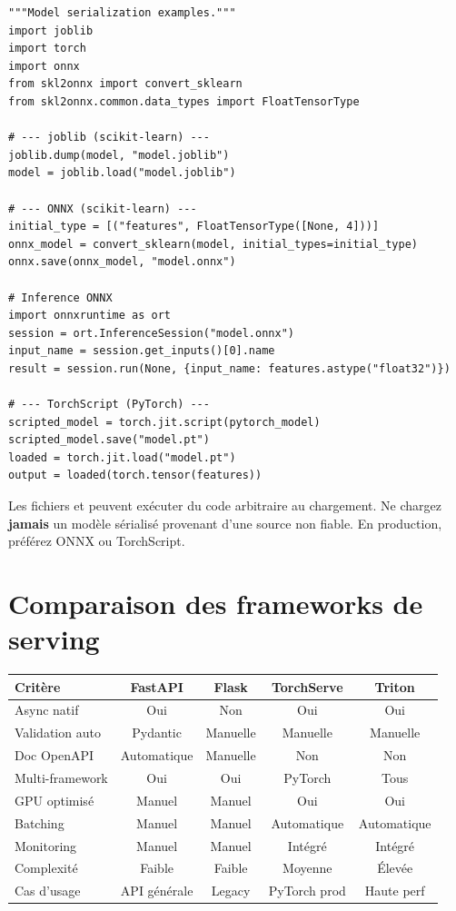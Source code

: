 \begin{codeblock}[title=\textbf{Export de mod\`eles dans diff\'erents formats}]
\begin{verbatim}
"""Model serialization examples."""
import joblib
import torch
import onnx
from skl2onnx import convert_sklearn
from skl2onnx.common.data_types import FloatTensorType

# --- joblib (scikit-learn) ---
joblib.dump(model, "model.joblib")
model = joblib.load("model.joblib")

# --- ONNX (scikit-learn) ---
initial_type = [("features", FloatTensorType([None, 4]))]
onnx_model = convert_sklearn(model, initial_types=initial_type)
onnx.save(onnx_model, "model.onnx")

# Inference ONNX
import onnxruntime as ort
session = ort.InferenceSession("model.onnx")
input_name = session.get_inputs()[0].name
result = session.run(None, {input_name: features.astype("float32")})

# --- TorchScript (PyTorch) ---
scripted_model = torch.jit.script(pytorch_model)
scripted_model.save("model.pt")
loaded = torch.jit.load("model.pt")
output = loaded(torch.tensor(features))
\end{verbatim}
\end{codeblock}

\begin{attention}[title=\textbf{S\'ecurit\'e de pickle/joblib}]
Les fichiers  et  peuvent ex\'ecuter du code
arbitraire au chargement. Ne chargez \textbf{jamais} un mod\`ele
s\'erialis\'e provenant d'une source non fiable. En production, pr\'ef\'erez
ONNX ou TorchScript.
\end{attention}

\section{Comparaison des frameworks de serving}
\label{sec:serving-comparison}

\begin{center}
\begin{tabular}{@{}lcccc@{}}
\toprule
\textbf{Crit\`ere} & \textbf{FastAPI} & \textbf{Flask} & \textbf{TorchServe} & \textbf{Triton} \\
\midrule
Async natif & Oui & Non & Oui & Oui \\
Validation auto & Pydantic & Manuelle & Manuelle & Manuelle \\
Doc OpenAPI & Automatique & Manuelle & Non & Non \\
Multi-framework & Oui & Oui & PyTorch & Tous \\
GPU optimis\'e & Manuel & Manuel & Oui & Oui \\
Batching & Manuel & Manuel & Automatique & Automatique \\
Monitoring & Manuel & Manuel & Int\'egr\'e & Int\'egr\'e \\
Complexit\'e & Faible & Faible & Moyenne & \'Elev\'ee \\
Cas d'usage & API g\'en\'erale & Legacy & PyTorch prod & Haute perf \\
\bottomrule
\end{tabular}
\end{center}

